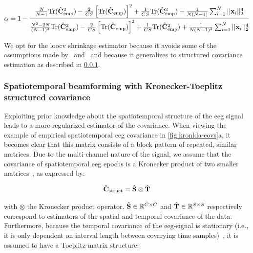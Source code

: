 	\begin{equation}
		\alpha =
		1-\frac{
      \frac{N}{N-1}\text{Tr}(\hat{\mathbf{C}}_\text{emp}^2)
      - \frac{2}{CS}\left[\text{Tr}(\hat{\mathbf{C}}_\text{emp})\right]^2
      + \frac{1}{CS}\text{Tr}(\hat{\mathbf{C}}_\text{emp}^2)
			- \frac{1}{N(N-1)}\sum_{i=1}^N||\mathbf{x}_i||_2^4
		}
		{
      \frac{N^2 -2N}{(N-1)^2}\text{Tr}(\hat{\mathbf{C}}_\text{emp}^2)
      - \frac{2}{CS}\left[\text{Tr}(\hat{\mathbf{C}}_\text{emp})\right]^2
      + \frac{1}{CS}\text{Tr}(\hat{\mathbf{C}}_\text{emp}^2)
			+ \frac{1}{N(N-1)^2}\sum_{i=1}^N||\mathbf{x}_i||_2^4
		}
		\label{eq:loocv}
	\end{equation}

	We opt for the \ac{loocv} shrinkage estimator because it avoids some of the
	assumptions made by~\cite{Ledoit2004} and~\cite{Chen2010} and
	because it generalizes to structured covariance estimation as described in
	\cref{seq:structured_estimation}.

	\subsubsection{Spatiotemporal beamforming with Kronecker-Toeplitz structured covariance}
	\label{seq:structured_estimation}
	Exploiting prior knowledge about the spatiotemporal structure of the \ac{eeg} signal leads to a more regularized estimator of the covariance.
	When viewing the example of empirical spatiotemporal \ac{eeg} covariance in
	\cref{fig:kronlda-covs}a, it becomes clear that this matrix consists of a block pattern of repeated, similar matrices.
	Due to the multi-channel nature of the signal, we assume that the covariance of spatiotemporal \ac{eeg} epochs is a Kronecker
	product of two smaller
	matrices~\cite{Munck1992,DeMunck1999,Huizenga2002}, as expressed
	by:

	\begin{equation}
    \hat{\mathbf{C}}_\text{struct} = \hat{\mathbf{S}} \otimes \hat{\mathbf{T}}
		\label{eq:kronecker}
	\end{equation}

	with $\otimes$ the Kronecker product operator.
  $\hat{\mathbf{S}} \in \mathbb{R}^{C\times C}$ and $\hat{\mathbf{T}} \in \mathbb{R}^{S\times S}$ respectively correspond to estimators of the spatial and temporal covariance of the data.
	Furthermore, because the temporal covariance of the \ac{eeg}-signal is
	stationary (i.e., it is only dependent on interval length between covarying
	time samples)~\cite{Bijma2003}, it is assumed to have a Toeplitz-matrix structure:

